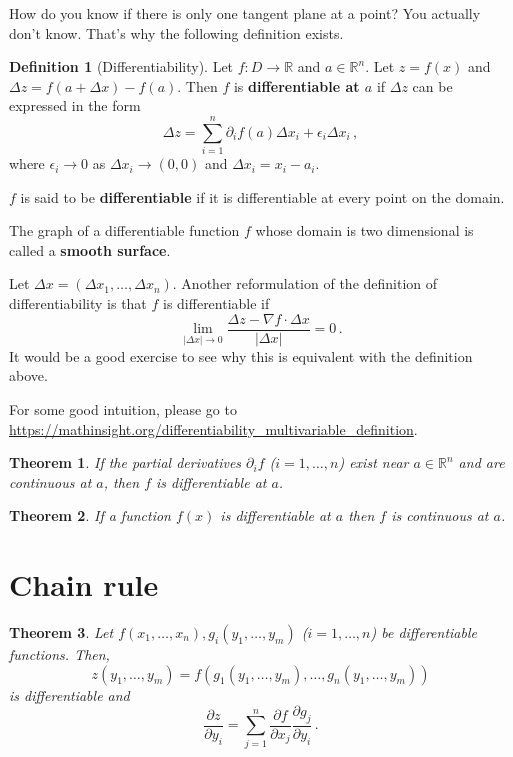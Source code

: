 \documentclass[
]{book}
\newtheorem{theorem}{Theorem}[chapter]
\theoremstyle{definition}
\newtheorem{definition}{Definition}[chapter]
\theoremstyle{definition}
\theoremstyle{definition}
\theoremstyle{definition}
\theoremstyle{remark}
\begin{document}
How do you know if there is only one tangent plane at a point?
You actually don't know.
That's why the following definition exists.

\begin{definition}[Differentiability]
Let \(f:D \to \mathbb{R}\) and \(a\in \mathbb{R}^n\).
Let \(z = f(x)\) and \(\Delta z = f(a + \Delta x ) - f(a)\).
Then \(f\) is \textbf{differentiable at \(a\)} if \(\Delta z\) can be
expressed in the form
\begin{equation*}
    \Delta z = \sum_{i=1}^n \partial_i f(a) \Delta x_i +  \epsilon_i \Delta x_i  \,,
\end{equation*}
where \(\epsilon_i \to 0\) as \(\Delta x_i \to (0,0)\) and
\(\Delta x_i = x_i - a_i\).

\(f\) is said to be \textbf{differentiable} if it is differentiable at every point on the domain.
\end{definition}

The graph of a differentiable function \(f\) whose
domain is two dimensional is called a \textbf{smooth surface}.

Let \(\Delta x = (\Delta x_1, \dots, \Delta x_n)\).
Another reformulation of the definition of differentiability is that \(f\) is
differentiable if
\begin{equation*}
\lim_{|\Delta x| \to 0}
    \frac{\Delta z - \nabla f \cdot \Delta x }{| \Delta x|}  = 0 \,.
\end{equation*}
It would be a good exercise to see why this is equivalent with the definition above.

For some good intuition, please go to \url{https://mathinsight.org/differentiability_multivariable_definition}.

\begin{theorem}
If the partial derivatives \(\partial_i f\) (\(i= 1, \dots, n\)) exist near \(a\in \mathbb{R}^n\) and are continuous
at \(a\), then \(f\) is differentiable at \(a\).
\end{theorem}

\begin{theorem}
If a function \(f(x)\) is differentiable at \(a\) then \(f\) is continuous at \(a\).
\end{theorem}

\section{Chain rule}\label{chain-rule}

\begin{theorem}
Let \(f(x_1,\dots, x_n), g_i(y_1,\dots, y_m)\) (\(i = 1,\dots, n\)) be
differentiable
functions.
Then,
\[z(y_1, \dots, y_m) = f(g_1(y_1, \dots, y_m), \dots, g_n(y_1, \dots, y_m))\]
is differentiable and
\begin{equation*}
    \frac{\partial z}{\partial y_i} = \sum_{j=1}^n \frac{\partial f}{\partial x_j} \frac{\partial g_j}{\partial y_i} \,.
\end{equation*}
\end{theorem}
\end{document}
